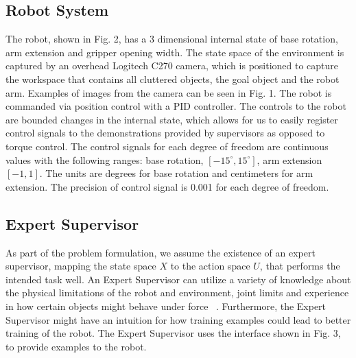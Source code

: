 \documentclass[10pt, conference]{ieeeconf}      %
\begin{document}
\subsection{Robot System}
The robot, shown in Fig. 2, has a 3 dimensional
internal state of base rotation, arm extension and
gripper opening width. The state space of the environment is captured by an overhead Logitech C270 camera,
which is positioned to capture the workspace that contains
all cluttered objects, the goal object and the robot arm.
Examples of images from the camera can be seen in Fig.
1. The robot is commanded via position control with a PID
controller. The controls to the robot are
bounded changes in the internal state, which allows for us to
easily register control signals to the demonstrations provided
by supervisors as opposed to torque control. The control
signals for each degree of freedom are continuous values
with the following ranges: base rotation, $[-15^\circ
, 15^\circ]$, arm
extension $[-1, 1]$. The units are degrees for base rotation
and centimeters for arm extension. The precision of control
signal is 0.001 for each degree of freedom. 

\subsection{Expert Supervisor} 
As part of the problem formulation, we assume the existence of an expert supervisor, mapping the state space $X$ to the action space $U$, that performs the intended task well. An Expert Supervisor can utilize a variety of knowledge about the physical limitations of the robot and environment,
joint limits and experience in how certain objects might
behave under force ~\cite{ross2013learning}. Furthermore, the Expert Supervisor might
have an intuition for how training examples could lead to
better training of the robot.
The Expert Supervisor uses the interface shown in Fig. 3, to provide examples
to the robot.
\end{document}

